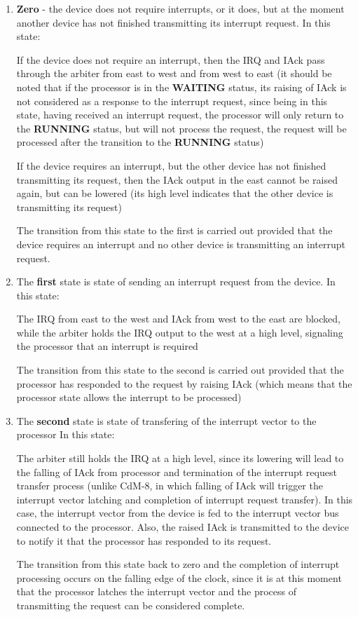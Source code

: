 \begin{enumerate}
	\item \textbf{Zero} - the device does not require interrupts, or it does, but at the moment another device has not finished transmitting its interrupt request. In this state:

		If the device does not require an interrupt, then the IRQ and IAck pass through the arbiter from east to west and from west to east (it should be noted that if the processor is in the \textbf{WAITING} status, its raising of IAck is not considered as a response to the interrupt request, since being in this state, having received an interrupt request, the processor will only return to the \textbf{RUNNING} status, but will not process the request, the request will be processed after the transition to the \textbf{RUNNING} status)

		If the device requires an interrupt, but the other device has not finished transmitting its request, then the IAck output in the east cannot be raised again, but can be lowered (its high level indicates that the other device is transmitting its request)

		The transition from this state to the first is carried out provided that the device requires an interrupt and no other device is transmitting an interrupt request.
	\item The \textbf{first} state is state of sending an interrupt request from the device.
		In this state:

		The IRQ from east to the west and IAck from west to the east are blocked, while the arbiter holds the IRQ output to the west at a high level, signaling the processor that an interrupt is required

		The transition from this state to the second is carried out provided that the processor has responded to the request by raising IAck (which means that the processor state allows the interrupt to be processed)
	\item The \textbf{second} state is state of transfering of the interrupt vector to the processor
		In this state:

		The arbiter still holds the IRQ at a high level, since its lowering will lead to the falling of IAck from processor and termination of the interrupt request transfer process (unlike CdM-8, in which falling of IAck will trigger the interrupt vector latching and completion of interrupt request transfer). In this case, the interrupt vector from the device is fed to the interrupt vector bus connected to the processor. Also, the raised IAck is transmitted to the device to notify it that the processor has responded to its request.

		The transition from this state back to zero and the completion of interrupt processing occurs on the falling edge of the clock, since it is at this moment that the processor latches the interrupt vector and the process of transmitting the request can be considered complete.
\end{enumerate}


